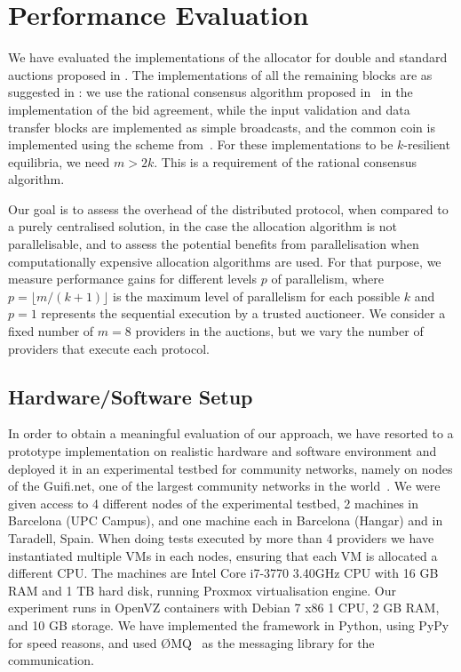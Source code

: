 
\section{Performance Evaluation}
\label{sec__dist_auctioneer_evaluation}

We have evaluated the implementations of the allocator for double and standard auctions proposed in .
The implementations of all the remaining blocks are as suggested in : 
we use the rational consensus algorithm proposed in~\cite{Afek2014} in the implementation of the bid agreement, 
while the input validation and data transfer blocks are implemented as simple broadcasts, 
and the common coin is implemented using the scheme from~\cite{Abraham2013}. 
For these implementations to be $k$-resilient equilibria, we need $m>2k$. 
This is a requirement of the rational consensus algorithm. 

Our goal is to assess the overhead of the distributed protocol, when compared to a purely centralised solution,
in the case the allocation algorithm is not parallelisable, 
and to assess the potential benefits from parallelisation when computationally expensive allocation algorithms are used. 
For that purpose, we measure performance gains for different levels $p$ of parallelism, where $p = \lfloor m/(k+1) \rfloor$ is the maximum level of parallelism for each possible $k$ and $p=1$ represents the sequential execution by a trusted auctioneer.
We consider a fixed number of $m=8$ providers in the auctions,
but we vary the number of providers that execute each protocol.

\subsection{Hardware/Software Setup}

In order to obtain a meaningful evaluation of our approach, we have resorted to a prototype implementation on realistic hardware and software environment and deployed it in an experimental testbed for community networks, namely on nodes of the Guifi.net, one of the largest community networks in the world~\cite{ClommunityTestbed}. 
We were given access to 4 different nodes of the experimental testbed, 2 machines in Barcelona (UPC Campus), and one machine each in Barcelona (Hangar) and in Taradell, Spain.
When doing tests executed by more than 4 providers we have instantiated 
multiple VMs in each nodes, ensuring that each VM is allocated a different CPU. 
The machines are Intel Core i7-3770 3.40GHz CPU with 16 GB RAM and 1 TB hard disk, running Proxmox virtualisation engine. 
Our experiment runs in OpenVZ containers with Debian 7 x86 1 CPU, 2 GB RAM, and 10 GB storage. 
We have implemented the framework in Python, using PyPy for speed reasons, 
and used \O{}MQ~\cite{ZeroMQ} as the messaging library for the communication.

